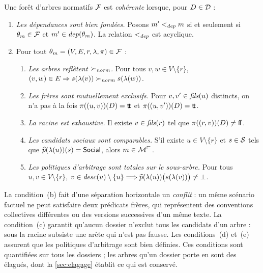\documentclass[review]{jflart}
\begin{document}
\begin{defi}\label{def:consistency}
Une forêt d'arbres normatifs \(\mathcal{F}\) est \emph{cohérente} lorsque, pour $D\in\mathcal{D}$ :
\begin{enumerate}
\item \emph{Les dépendances sont bien fondées.} Posons \(m'<_{\mathit{dep}}m\) si et
  seulement si \(\theta_m\in\mathcal{F}\) et \(m'\in\mathit{dep}(\theta_m)\). La relation
  \(<_{\mathit{dep}}\) est acyclique.
\item Pour tout \(\theta_m=(V,E,r,\lambda,\pi)\in\mathcal{F}\) :
\begin{enumerate}
\item \emph{Les arbres reflètent \(\succ_{\mathit{norm}}\).} Pour tous \(v,w\in V\setminus\{r\}\),
  \((v,w)\in E\Rightarrow s(\lambda(v))\succ_{\mathit{norm}} s(\lambda(w))\).
\item \emph{Les frères sont mutuellement exclusifs.} Pour
  \(v,v'\in\mathit{fils}(u)\) distincts, on n'a pas à la fois
  \(\pi((u,v))(D)={\mathsf{t\!t}}\) et \(\pi((u,v'))(D)={\mathsf{t\!t}}\).
\item \emph{La racine est exhaustive.} Il existe \(v\in\mathit{fils}(r)\) tel que
  \(\pi((r,v))(D)\neq{\mathsf{f\!f}}\).
\item \emph{Les candidats sociaux sont comparables.} S'il existe
  \(u\in V\setminus\{r\}\) et \(s\in\mathcal{S}\) tels que
  \(\widehat p(\lambda(u))(s)=\mathsf{Social}\), alors \(m\in\mathcal{M}^{\mathrel{\sqsubseteq_{}}}\).
\item \emph{Les politiques d'arbitrage sont totales sur le sous-arbre.} Pour
  tous \(u,v \in V\setminus\{r\}\),
  \(v \in \mathit{desc}(u)\setminus\{u\} \Longrightarrow
  \widehat p(\lambda(u))
    \bigl(s(\lambda(v))\bigr)
  \neq \bot\).
\end{enumerate}
\end{enumerate}
\end{defi}
La condition~(b) fait d'une séparation horizontale un \emph{conflit} : un même
scénario factuel ne peut satisfaire deux prédicats frères, qui représentent
des conventions collectives différentes ou des versions successives d'un
même texte. La condition~(c) garantit qu'aucun dossier
n'exclut tous les candidats d'un arbre : sous la racine subsiste une arête
qui n'est pas fausse. Les conditions~(d) et~(e) assurent que les politiques
d'arbitrage sont bien définies. Ces conditions sont quantifiées sur tous les
dossiers ; les arbres qu'un dossier porte en sont des élagués, dont la
\autoref{sec:elagage} établit ce qui est conservé.
\end{document}
